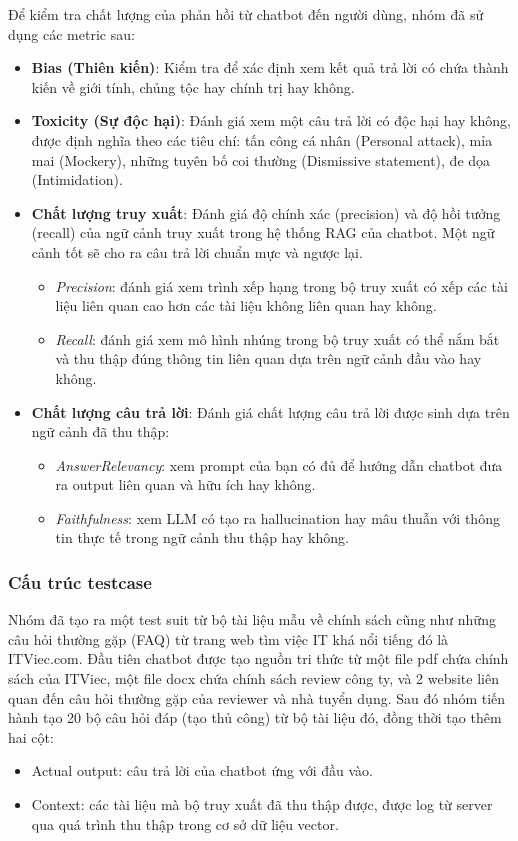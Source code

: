 Để kiểm tra chất lượng của phản hồi từ chatbot đến người dùng, nhóm đã sử dụng các metric sau:
\begin{itemize}
	\item \textbf{Bias (Thiên kiến)}: Kiểm tra để xác định xem kết quả trả lời có chứa thành kiến về giới tính, chủng tộc hay chính trị hay không.
	\item \textbf{Toxicity (Sự độc hại)}: Đánh giá xem một câu trả lời có độc hại hay không, được định nghĩa theo các tiêu chí: tấn công cá nhân (Personal attack), mỉa mai (Mockery), những tuyên bố coi thường (Dismissive statement), đe dọa (Intimidation).
	\item \textbf{Chất lượng truy xuất}: Đánh giá độ chính xác (precision) và độ hồi tưởng (recall) của ngữ cảnh truy xuất trong hệ thống RAG của chatbot. Một ngữ cảnh tốt sẽ cho ra câu trả lời chuẩn mực và ngược lại.
	\begin{itemize}
		\item \emph{Precision}: đánh giá xem trình xếp hạng trong bộ truy xuất có xếp các tài liệu liên quan cao hơn các tài liệu không liên quan hay không.
		\item \emph{Recall}: đánh giá xem mô hình nhúng trong bộ truy xuất có thể nắm bắt và thu thập đúng thông tin liên quan dựa trên ngữ cảnh đầu vào hay không.
	\end{itemize}
	\item \textbf{Chất lượng câu trả lời}: Đánh giá chất lượng câu trả lời được sinh dựa trên ngữ cảnh đã thu thập:
	\begin{itemize}
		\item \emph{AnswerRelevancy}: xem prompt của bạn có đủ để hướng dẫn chatbot đưa ra output liên quan và hữu ích hay không.
		\item \emph{Faithfulness}: xem LLM có tạo ra hallucination hay mâu thuẫn với thông tin thực tế trong ngữ cảnh thu thập hay không.
	\end{itemize}
\end{itemize}

\subsubsection{Cấu trúc testcase}
Nhóm đã tạo ra một test suit từ bộ tài liệu mẫu về chính sách cũng như những câu hỏi thường gặp (FAQ) từ trang web tìm việc IT khá nổi tiếng đó là ITViec.com. Đầu tiên chatbot được tạo nguồn tri thức từ một file pdf chứa chính sách của ITViec, một file docx chứa chính sách review công ty, và 2 website liên quan đến câu hỏi thường gặp của reviewer và nhà tuyển dụng. Sau đó nhóm tiến hành tạo 20 bộ câu hỏi đáp (tạo thủ công) từ bộ tài liệu đó, đồng thời tạo thêm hai cột:
\begin{itemize}
	\item Actual output: câu trả lời của chatbot ứng với đầu vào.
	\item Context: các tài liệu mà bộ truy xuất đã thu thập được, được log từ server qua quá trình thu thập trong cơ sở dữ liệu vector.
\end{itemize}

